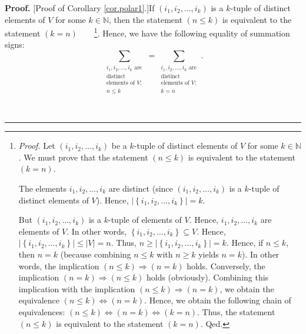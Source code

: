 \documentclass[numbers=enddot,12pt,final,onecolumn,notitlepage]{scrartcl}%
\theoremstyle{definition}
\newenvironment{proof}[1][Proof]{\noindent\textbf{#1.} }{\ \rule{0.5em}{0.5em}}
\let\sumnonlimits\sum
\renewcommand{\sum}{\sumnonlimits\limits}
\newenvironment{verlong}{}{}
\begin{document}
\begin{verlong}
\begin{proof}
[Proof of Corollary \ref{cor.polar1}.]If $\left(  i_{1},i_{2},\ldots
,i_{k}\right)  $ is a $k$-tuple of distinct elements of $V$ for some
$k\in\mathbb{N}$, then the statement $\left(  n\leq k\right)  $ is equivalent
to the statement $\left(  k=n\right)  $\ \ \ \ \footnote{\textit{Proof.} Let
$\left(  i_{1},i_{2},\ldots,i_{k}\right)  $ be a $k$-tuple of distinct
elements of $V$ for some $k\in\mathbb{N}$. We must prove that the statement
$\left(  n\leq k\right)  $ is equivalent to the statement $\left(  k=n\right)
$.
\par
The elements $i_{1},i_{2},\ldots,i_{k}$ are distinct (since $\left(
i_{1},i_{2},\ldots,i_{k}\right)  $ is a $k$-tuple of distinct elements of
$V$). Hence, $\left\vert \left\{  i_{1},i_{2},\ldots,i_{k}\right\}
\right\vert =k$.
\par
But $\left(  i_{1},i_{2},\ldots,i_{k}\right)  $ is a $k$-tuple of elements of
$V$. Hence, $i_{1},i_{2},\ldots,i_{k}$ are elements of $V$. In other words,
$\left\{  i_{1},i_{2},\ldots,i_{k}\right\}  \subseteq V$. Hence, $\left\vert
\left\{  i_{1},i_{2},\ldots,i_{k}\right\}  \right\vert \leq\left\vert
V\right\vert =n$. Thus, $n\geq\left\vert \left\{  i_{1},i_{2},\ldots
,i_{k}\right\}  \right\vert =k$. Hence, if $n\leq k$, then $n=k$ (because
combining $n\leq k$ with $n\geq k$ yields $n=k$). In other words, the
implication $\left(  n\leq k\right)  \Longrightarrow\left(  n=k\right)  $
holds. Conversely, the implication $\left(  n=k\right)  \Longrightarrow\left(
n\leq k\right)  $ holds (obviously). Combining this implication with the
implication $\left(  n\leq k\right)  \Longrightarrow\left(  n=k\right)  $, we
obtain the equivalence $\left(  n\leq k\right)  \Longleftrightarrow\left(
n=k\right)  $. Hence, we obtain the following chain of equivalences: $\left(
n\leq k\right)  \Longleftrightarrow\left(  n=k\right)  \Longleftrightarrow
\left(  k=n\right)  $. Thus, the statement $\left(  n\leq k\right)  $ is
equivalent to the statement $\left(  k=n\right)  $. Qed.}. Hence, we have the
following equality of summation signs:%
\begin{equation}
\sum_{\substack{i_{1},i_{2},\ldots,i_{k}\text{ are}\\\text{distinct}%
\\\text{elements of }V;\\n\leq k}}=\sum_{\substack{i_{1},i_{2},\ldots
,i_{k}\text{ are}\\\text{distinct}\\\text{elements of }V;\\k=n}}.
\label{pf.cor.polar1.sumeq1}%
\end{equation}



\end{proof}
\end{verlong}
\end{document}
